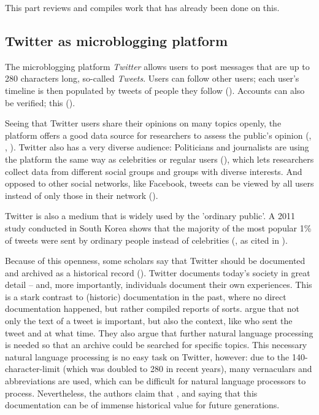 This part reviews and compiles work that has already been done on this.

\subsection{Twitter as microblogging platform}
The microblogging platform \emph{Twitter} allows users to post messages that are up to 280 characters long, so-called \emph{Tweets}. Users can follow other users; each user's timeline is then populated by tweets of people they follow (\cite{thimm_twitter_2012}). Accounts can also be verified; this  (\cite{twitter_inc_about_nodate-1}). 

Seeing that Twitter users share their opinions on many topics openly, the platform offers a good data source for researchers to assess the public's opinion (\cite{pak2010twitter}, \cite{pfaffenberger2016twitter}, \cite{broniatowski2014twitter}). Twitter also has a very diverse audience: Politicians and journalists are using the platform the same way as celebrities or regular users (\cite{pak2010twitter}), which lets researchers collect data from different social groups and groups with diverse interests. And opposed to other social networks, like Facebook, tweets can be viewed by all users instead of only those in their network (\cite{park_does_2013}).

Twitter is also a medium that is widely used by the 'ordinary public'. A 2011 study conducted in South Korea shows that the majority of the most popular 1\% of tweets were sent by ordinary people instead of celebrities (\cite{chang2011structure}, as cited in \cite{park_does_2013}).

Because of this openness, some scholars say that Twitter should be documented and archived as a historical record (\cite{risse2014documenting}). Twitter documents today's society in great detail -- and, more importantly, individuals document their own experiences. This is a stark contrast to (historic) documentation in the past, where no direct documentation happened, but rather compiled reports of sorts. \citeauthor{risse2014documenting} argue that not only the text of a tweet is important, but also the context, like who sent the tweet and at what time. They also argue that further natural language processing is needed so that an archive could be searched for specific topics. This necessary natural language processing is no easy task on Twitter, however: due to the 140-character-limit (which was doubled to 280 in recent years), many vernaculars and abbreviations are used, which can be difficult for natural language processors to process. Nevertheless, the authors claim that  \cite[9]{risse2014documenting}, and saying that this documentation can be of immense historical value for future generations.

